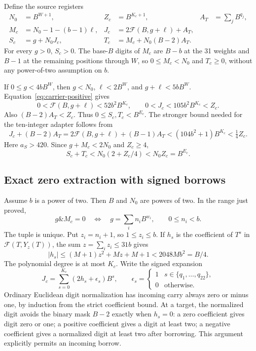 Define the source registers
\begin{align*}
 N_0&=B^{W+1},& Z_c&=B^{K_c+1},& A_T&=\sum_jB^{q_j},\\
 M_c&=N_0-1-(b-1)\ell,& J_c&=2\mathcal F(B,g+\ell)+A_T,\\
 S_c&=g+N_0J_c,&T_c&=M_c+N_0(B-2)A_T.
\end{align*}
For every \(g>0\), \(S_c>0\).  The base-\(B\) digits of \(M_c\)
are \(B-b\) at the 31 weights and \(B-1\) at the remaining positions
through \(W\), so \(0\le M_c<N_0\) and \(T_c\ge0\), without any
power-of-two assumption on \(b\).

If \(0\le g<4bB^W\), then \(g<N_0\), \(\ell<2B^W\), and
\(g+\ell<5bB^W\).  Equation~\eqref{eq:carrier-positive} gives
\[
 0<\mathcal F(B,g+\ell)<52b^2B^{K_c},\qquad
 0<J_c<105b^2B^{K_c}<Z_c.
\]
Also \((B-2)A_T<Z_c\).  Thus \(0\le S_c,T_c<B^{E_c}\).
The stronger bound needed for the ten-integer adapter follows from
\[
 J_c+(B-2)A_T
 =2\mathcal F(B,g+\ell)+(B-1)A_T
 <(104b^2+1)B^{K_c}<\tfrac14Z_c.
\]
Here \(a_S>420\).  Since \(g+M_c<2N_0\) and \(Z_c\ge4\),
\begin{equation}
 S_c+T_c<N_0(2+Z_c/4)<N_0Z_c=B^{E_c}.
 \label{eq:source-sum-range}
\end{equation}

\subsection{Exact zero extraction with signed borrows}

Assume \(b\) is a power of two.  Then \(B\) and \(N_0\) are powers
of two.  In the range just proved,
\[
 g\mathbin{\&}M_c=0
 \quad\Longleftrightarrow\quad
 g=\sum_i n_iB^{w_i},\qquad 0\le n_i<b.
\]
The tuple is unique.  Put \(z_i=n_i+1\), so \(1\le z_i\le b\).
If \(h_s\) is the coefficient of \(T^s\) in
\(\mathcal F(T,Y_z(T))\), the sum \(z=\sum_i z_i\le31b\) gives
\[
 |h_s|\le (M+1)z^2+Mz+M+1<2048Mb^2=B/4.
\]
The polynomial degree is at most \(K_c\).  Write the signed expansion
\[
 J_c=\sum_{s=0}^{K_c}(2h_s+\epsilon_s)B^s,
 \qquad \epsilon_s=\begin{cases}1&s\in\{q_1,\ldots,q_{22}\},\\0&\text{otherwise.}\end{cases}
\]
Ordinary Euclidean digit normalization has incoming carry always zero
or minus one, by induction from the strict coefficient bound.  At a target,
the normalized digit avoids the binary mask \(B-2\) exactly when
\(h_s=0\): a zero coefficient gives digit zero or one; a positive
coefficient gives a digit at least two; a negative coefficient gives a
normalized digit at least two after borrowing.  This argument explicitly
permits an incoming borrow.

